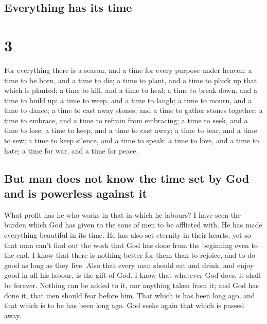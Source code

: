\hypertarget{everything-has-its-time}{%
\subsection{Everything has its time}\label{everything-has-its-time}}

\hypertarget{section-2}{%
\section{3}\label{section-2}}

 For everything there is a season, and a time for every
purpose under heaven:  a time to be born, and a time to
die; a time to plant, and a time to pluck up that which is planted;
 a time to kill, and a time to heal; a time to break down,
and a time to build up;  a time to weep, and a time to
laugh; a time to mourn, and a time to dance;  a time to
cast away stones, and a time to gather stones together; a time to
embrace, and a time to refrain from embracing;  a time to
seek, and a time to lose; a time to keep, and a time to cast away;
 a time to tear, and a time to sew; a time to keep
silence, and a time to speak;  a time to love, and a time
to hate; a time for war, and a time for peace.

\hypertarget{but-man-does-not-know-the-time-set-by-god-and-is-powerless-against-it}{%
\subsection{But man does not know the time set by God and is powerless
against
it}\label{but-man-does-not-know-the-time-set-by-god-and-is-powerless-against-it}}

 What profit has he who works in that in which he labours?
 I have seen the burden which God has given to the sons
of men to be afflicted with.  He has made everything
beautiful in its time. He has also set eternity in their hearts, yet so
that man can't find out the work that God has done from the beginning
even to the end.  I know that there is nothing better for
them than to rejoice, and to do good as long as they live.
 Also that every man should eat and drink, and enjoy good
in all his labour, is the gift of God.  I know that
whatever God does, it shall be forever. Nothing can be added to it, nor
anything taken from it; and God has done it, that men should fear before
him.  That which is has been long ago, and that which is
to be has been long ago. God seeks again that which is passed away.

